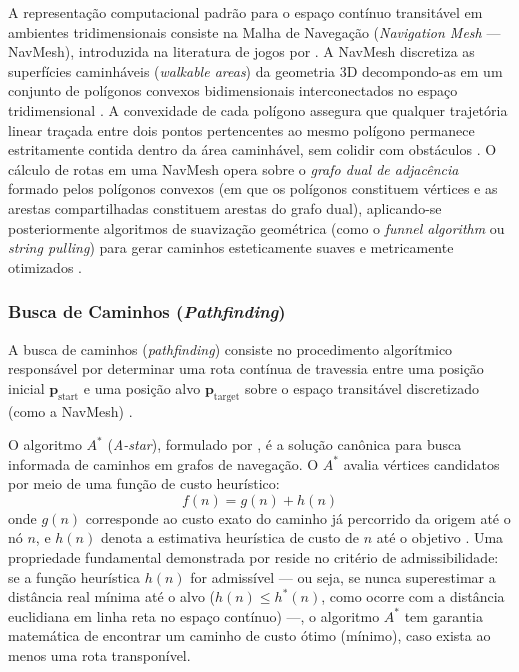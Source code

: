 A representação computacional padrão para o espaço contínuo transitável em ambientes tridimensionais consiste na Malha de Navegação (\textit{Navigation Mesh} --- NavMesh), introduzida na literatura de jogos por \textcite{snook2000simplified}. A NavMesh discretiza as superfícies caminháveis (\textit{walkable areas}) da geometria 3D decompondo-as em um conjunto de polígonos convexos bidimensionais interconectados no espaço tridimensional \cite{snook2000simplified}. A convexidade de cada polígono assegura que qualquer trajetória linear traçada entre dois pontos pertencentes ao mesmo polígono permanece estritamente contida dentro da área caminhável, sem colidir com obstáculos \cite{snook2000simplified}. O cálculo de rotas em uma NavMesh opera sobre o \textit{grafo dual de adjacência} formado pelos polígonos convexos (em que os polígonos constituem vértices e as arestas compartilhadas constituem arestas do grafo dual), aplicando-se posteriormente algoritmos de suavização geométrica (como o \textit{funnel algorithm} ou \textit{string pulling}) para gerar caminhos esteticamente suaves e metricamente otimizados \cite{snook2000simplified}.

\subsubsection{Busca de Caminhos (\textit{Pathfinding})}
\label{sec:pathfinding}

A busca de caminhos (\textit{pathfinding}) consiste no procedimento algorítmico responsável por determinar uma rota contínua de travessia entre uma posição inicial $\mathbf{p}_{\text{start}}$ e uma posição alvo $\mathbf{p}_{\text{target}}$ sobre o espaço transitável discretizado (como a NavMesh) \cite{hart1968formal, snook2000simplified, xu2025databasedrivenframework3dlevel}.

O algoritmo $A^*$ (\textit{A-star}), formulado por \textcite{hart1968formal}, é a solução canônica para busca informada de caminhos em grafos de navegação. O $A^*$ avalia vértices candidatos por meio de uma função de custo heurístico:
\begin{equation}
    f(n) = g(n) + h(n)
\end{equation}
onde $g(n)$ corresponde ao custo exato do caminho já percorrido da origem até o nó $n$, e $h(n)$ denota a estimativa heurística de custo de $n$ até o objetivo \cite{hart1968formal}. Uma propriedade fundamental demonstrada por \textcite{hart1968formal} reside no critério de admissibilidade: se a função heurística $h(n)$ for admissível --- ou seja, se nunca superestimar a distância real mínima até o alvo ($h(n) \le h^*(n)$, como ocorre com a distância euclidiana em linha reta no espaço contínuo) ---, o algoritmo $A^*$ tem garantia matemática de encontrar um caminho de custo ótimo (mínimo), caso exista ao menos uma rota transponível.

